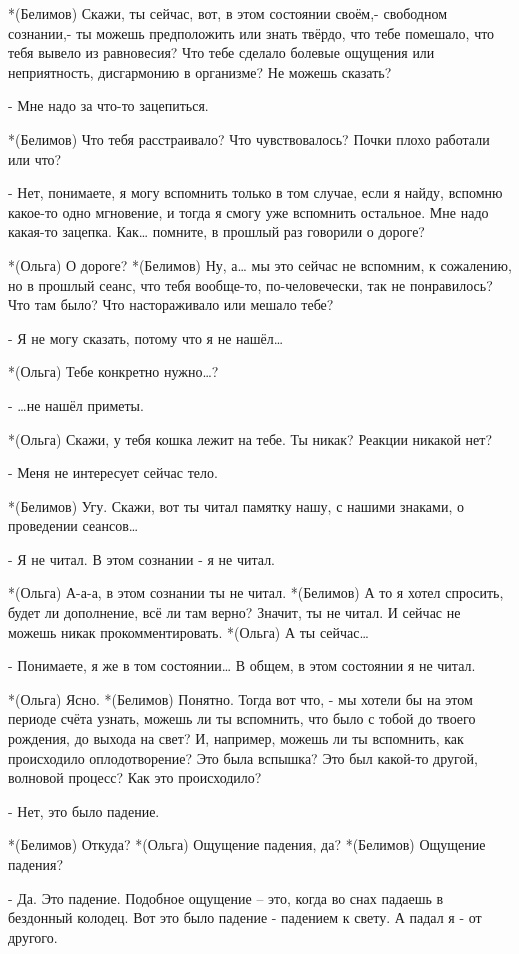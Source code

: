 *(Белимов) Скажи, ты сейчас, вот, в этом состоянии своём,- свободном сознании,- ты можешь предположить или знать твёрдо, что тебе помешало, что тебя вывело из равновесия? Что тебе сделало болевые ощущения или неприятность, дисгармонию в организме?  Не можешь сказать?

- Мне надо за что-то зацепиться.

*(Белимов) Что тебя расстраивало? Что чувствовалось? Почки плохо работали или что?

- Нет, понимаете, я могу вспомнить только в том случае, если я найду, вспомню какое-то одно мгновение, и тогда я смогу уже вспомнить остальное. Мне надо какая-то зацепка. Как… помните, в прошлый раз говорили о дороге?

*(Ольга) О дороге?
*(Белимов) Ну, а… мы это сейчас не вспомним, к сожалению, но в прошлый сеанс, что тебя вообще-то, по-человечески, так не понравилось? Что там было? Что настораживало или мешало тебе?

- Я не могу сказать, потому что я не нашёл…

*(Ольга) Тебе конкретно нужно…?

- …не нашёл приметы.

*(Ольга) Скажи, у тебя кошка лежит на тебе. Ты никак? Реакции никакой нет?

- Меня не интересует сейчас тело.

*(Белимов) Угу. Скажи, вот ты читал памятку нашу, с нашими знаками, о проведении сеансов…

- Я не читал. В этом сознании  - я не читал.

*(Ольга) А-а-а, в этом сознании ты не читал.
*(Белимов) А то я хотел спросить, будет ли дополнение, всё ли там верно? Значит, ты не читал. И сейчас не можешь никак прокомментировать.
*(Ольга) А ты сейчас…

- Понимаете, я же в том состоянии… В общем, в этом состоянии я не читал.

*(Ольга) Ясно.
*(Белимов) Понятно. Тогда вот что, - мы хотели бы на этом периоде счёта узнать, можешь ли ты вспомнить, что было с тобой до твоего рождения, до выхода на свет? И, например, можешь ли ты вспомнить, как происходило оплодотворение? Это была вспышка? Это был какой-то другой, волновой процесс? Как это происходило?

- Нет, это было падение.

*(Белимов) Откуда?
*(Ольга) Ощущение падения, да?
*(Белимов) Ощущение падения?

- Да. Это падение. Подобное ощущение – это, когда во снах падаешь в бездонный колодец. Вот это было падение - падением к свету. А падал я - от другого.


